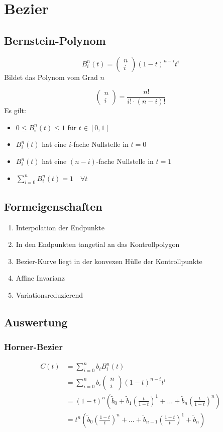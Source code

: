 \section{Bezier}
\subsection{Bernstein-Polynom}
$$
	B_i^n(t)=\begin{pmatrix} n \\ i \end{pmatrix}(1-t)^{n-i}t^i
$$
Bildet das Polynom vom Grad $n$

$$
	\begin{pmatrix} n \\ i \end{pmatrix}= \frac{n!}{i!\cdot(n-i)!}
$$
Es gilt:
\begin{itemize}
	\item $0\leq B_i^n(t)\leq1$ für $t\in[0,1]$
	\item $B_i^n(t)$ hat eine $i$-fache Nullstelle in $t=0$
	\item $B_i^n(t)$ hat eine $(n-i)$-fache Nullstelle in $t=1$
	\item $\sum\limits_{i=0}^{n}B_i^n(t)=1 \quad \forall t$
\end{itemize}
\subsection{Formeigenschaften}
\begin{enumerate}
  \item Interpolation der Endpunkte
  \item In den Endpunkten tangetial an das Kontrollpolygon
  \item Bezier-Kurve liegt in der konvexen Hülle der Kontrollpunkte
  \item Affine Invarianz
  \item Variationsreduzierend
\end{enumerate}
\subsection{Auswertung}
\subsubsection{Horner-Bezier}
\begin{align*}
	C(t) &= \sum_{i=0}^n b_i B_i^n (t) \\
	 &= \sum_{i=0}^nb_i \begin{pmatrix} n \\ i \end{pmatrix} (1-t)^{n-i}t^i \\
	 &= (1-t)^n(\tilde b_0 + \tilde b_1 (\frac{t}{1-t})^1 + \dots + \tilde b_n(\frac{t}{1-t})^n) \\
	 &= t^n (\tilde b_0 (\frac{1-t}{t})^n + \dots + \tilde b_{n-1} (\frac{1-t}{t})^{1} + \tilde b_n)
\end{align*}
